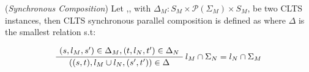 
\begin{definition} 
	\label{def:synchronous_composition}(\emph{Synchronous Composition}) Let ,, with $\Delta_M : S_M \times \mathcal{P}(\Sigma_M) \times S_M$, be two CLTS instances, then CLTS synchronous parallel composition is defined as  where $\Delta$ is the smallest relation s.t:
	\begin{center}
		\begin{equation}
		\AxiomC{$(s, l_M, s') \in \Delta_M,(t, l_N, t') \in \Delta_N  $}\RightLabel{$l_M \cap \Sigma_N = l_N \cap \Sigma_M$}
		\UnaryInfC{$((s,t),l_M \cup l_N,(s',t')) \in \Delta$}
		\DisplayProof	
		\end{equation}	
	\end{center}
\end{definition}